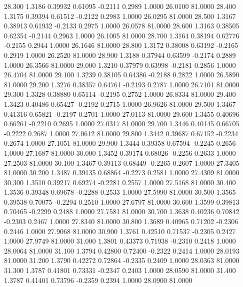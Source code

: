   28.300   1.3186   0.39932   0.61095  -0.2111   0.2989   1.0000  26.0100  81.0000
  28.400   1.3175   0.39394   0.61512  -0.2122   0.2983   1.0000  26.0295  81.0000
  28.500   1.3167   0.38913   0.61932  -0.2133   0.2975   1.0000  26.0578  81.0000
  28.600   1.3163   0.38505   0.62354  -0.2144   0.2963   1.0000  26.1005  81.0000
  28.700   1.3164   0.38194   0.62776  -0.2155   0.2944   1.0000  26.1646  81.0000
  28.800   1.3172   0.38008   0.63192  -0.2165   0.2919   1.0000  26.2520  81.0000
  28.900   1.3188   0.37944   0.63599  -0.2174   0.2889   1.0000  26.3566  81.0000
  29.000   1.3210   0.37979   0.63998  -0.2181   0.2856   1.0000  26.4704  81.0000
  29.100   1.3239   0.38105   0.64386  -0.2188   0.2822   1.0000  26.5890  81.0000
  29.200   1.3276   0.38357   0.64761  -0.2193   0.2787   1.0000  26.7101  81.0000
  29.300   1.3328   0.38880   0.65114  -0.2195   0.2752   1.0000  26.8334  81.0000
  29.400   1.3423   0.40486   0.65427  -0.2192   0.2715   1.0000  26.9626  81.0000
  29.500   1.3467   0.41316   0.65821  -0.2197   0.2701   1.0000  27.0113  81.0000
  29.600   1.3455   0.40696   0.66261  -0.2210   0.2695   1.0000  27.0317  81.0000
  29.700   1.3446   0.40145   0.66705  -0.2222   0.2687   1.0000  27.0612  81.0000
  29.800   1.3442   0.39687   0.67152  -0.2234   0.2674   1.0000  27.1051  81.0000
  29.900   1.3444   0.39358   0.67594  -0.2245   0.2656   1.0000  27.1687  81.0000
  30.000   1.3452   0.39174   0.68026  -0.2256   0.2633   1.0000  27.2503  81.0000
  30.100   1.3467   0.39113   0.68449  -0.2265   0.2607   1.0000  27.3405  81.0000
  30.200   1.3487   0.39135   0.68864  -0.2273   0.2581   1.0000  27.4309  81.0000
  30.300   1.3510   0.39217   0.69274  -0.2281   0.2557   1.0000  27.5168  81.0000
  30.400   1.3536   0.39348   0.69678  -0.2288   0.2533   1.0000  27.5990  81.0000
  30.500   1.3565   0.39538   0.70075  -0.2294   0.2510   1.0000  27.6797  81.0000
  30.600   1.3599   0.39813   0.70465  -0.2299   0.2488   1.0000  27.7581  81.0000
  30.700   1.3638   0.40236   0.70842  -0.2303   0.2467   1.0000  27.8340  81.0000
  30.800   1.3689   0.40965   0.71202  -0.2306   0.2446   1.0000  27.9068  81.0000
  30.900   1.3761   0.42510   0.71537  -0.2305   0.2427   1.0000  27.9749  81.0000
  31.000   1.3801   0.43373   0.71938  -0.2310   0.2418   1.0000  28.0064  81.0000
  31.100   1.3794   0.42800   0.72400  -0.2322   0.2414   1.0000  28.0193  81.0000
  31.200   1.3790   0.42272   0.72864  -0.2335   0.2409   1.0000  28.0363  81.0000
  31.300   1.3787   0.41801   0.73331  -0.2347   0.2403   1.0000  28.0590  81.0000
  31.400   1.3787   0.41401   0.73796  -0.2359   0.2394   1.0000  28.0900  81.0000
